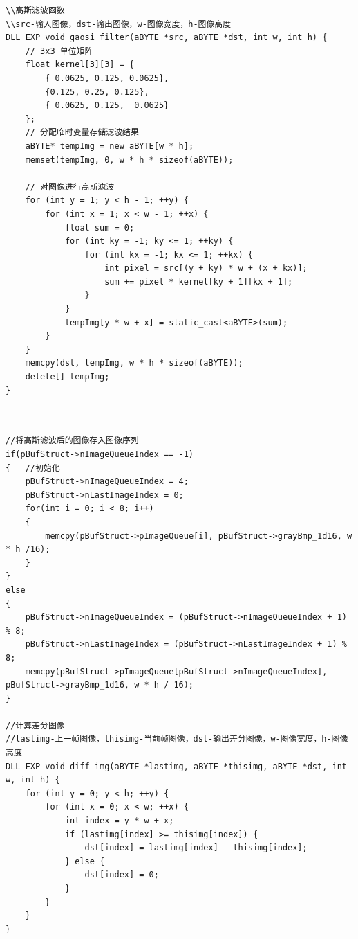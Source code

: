 \documentclass[12pt,hyperref,a4paper,UTF8]{ctexart}
\begin{document}
        \begin{lstlisting}[caption={高斯滤波}, label={lst:example}]
\\高斯滤波函数
\\src-输入图像，dst-输出图像，w-图像宽度，h-图像高度
DLL_EXP void gaosi_filter(aBYTE *src, aBYTE *dst, int w, int h) {
    // 3x3 单位矩阵
    float kernel[3][3] = {
        { 0.0625, 0.125, 0.0625},
        {0.125, 0.25, 0.125},
        { 0.0625, 0.125,  0.0625}
    };
    // 分配临时变量存储滤波结果
    aBYTE* tempImg = new aBYTE[w * h];
    memset(tempImg, 0, w * h * sizeof(aBYTE));

    // 对图像进行高斯滤波
    for (int y = 1; y < h - 1; ++y) {
        for (int x = 1; x < w - 1; ++x) {
            float sum = 0;
            for (int ky = -1; ky <= 1; ++ky) {
                for (int kx = -1; kx <= 1; ++kx) {
                    int pixel = src[(y + ky) * w + (x + kx)];
                    sum += pixel * kernel[ky + 1][kx + 1];
                }
            }
            tempImg[y * w + x] = static_cast<aBYTE>(sum);
        }
    }
    memcpy(dst, tempImg, w * h * sizeof(aBYTE));
    delete[] tempImg;
}


        \end{lstlisting}






        \begin{lstlisting}[caption={差分图像函数}, label={lst:example}]

//将高斯滤波后的图像存入图像序列
if(pBufStruct->nImageQueueIndex == -1)
{   //初始化
    pBufStruct->nImageQueueIndex = 4;
    pBufStruct->nLastImageIndex = 0;
    for(int i = 0; i < 8; i++)
    {
        memcpy(pBufStruct->pImageQueue[i], pBufStruct->grayBmp_1d16, w * h /16);
    }
}
else
{
    pBufStruct->nImageQueueIndex = (pBufStruct->nImageQueueIndex + 1) % 8;
    pBufStruct->nLastImageIndex = (pBufStruct->nLastImageIndex + 1) % 8;
    memcpy(pBufStruct->pImageQueue[pBufStruct->nImageQueueIndex], pBufStruct->grayBmp_1d16, w * h / 16);
}

//计算差分图像
//lastimg-上一帧图像，thisimg-当前帧图像，dst-输出差分图像，w-图像宽度，h-图像高度
DLL_EXP void diff_img(aBYTE *lastimg, aBYTE *thisimg, aBYTE *dst, int w, int h) {
    for (int y = 0; y < h; ++y) {
        for (int x = 0; x < w; ++x) {
            int index = y * w + x;
            if (lastimg[index] >= thisimg[index]) {
                dst[index] = lastimg[index] - thisimg[index];
            } else {
                dst[index] = 0;
            }
        }
    }
}

        \end{lstlisting}
\end{document}
